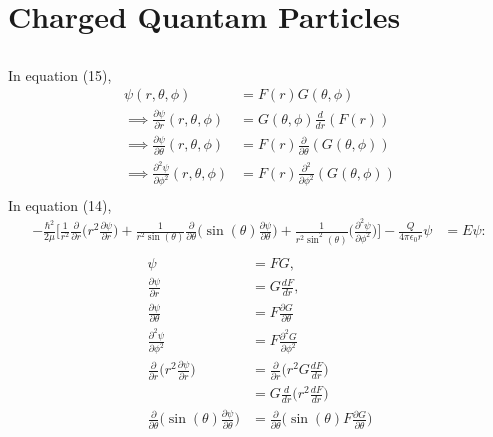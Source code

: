 \documentclass{article}
\begin{document}
\newpage
\section{Charged Quantam Particles}
\subsection{}%

\large{
In equation (15),\\
\begin{align*}
    \psi(r,\theta,\phi) &= F(r)G(\theta,\phi)\\
    \implies \frac{\partial \psi}{\partial r} (r,\theta,\phi) &= G(\theta, \phi)\frac{d}{dr}(F(r))\\
    \implies \frac{\partial \psi}{\partial \theta} (r,\theta,\phi) &= F(r)\frac{\partial}{\partial\theta}(G(\theta, \phi))\\
    \implies \frac{\partial^2 \psi}{\partial \phi^2} (r,\theta,\phi) &= F(r)\frac{\partial^2}{\partial\phi^2}(G(\theta, \phi))\\
\end{align*}
In equation (14),\\
\begin{align*}
    -\frac{\hbar^2}{2\mu}\Big[\frac{1}{r^2}\frac{\partial}{\partial r}\Big(r^2\frac{\partial \psi}{\partial r}\Big)+\frac{1}{r^2\sin(\theta)}\frac{\partial}{\partial \theta}\Big(\sin(\theta)\frac{\partial \psi}{\partial \theta}\Big)+\frac{1}{r^2\sin^2(\theta)}\Big(\frac{\partial^2\psi}{\partial \phi^2}\Big)\Big]-\frac{Q}{4\pi \epsilon_0r}\psi &= E\psi:\\
\end{align*}
\begin{align*}
    \psi &= FG,\\
    \frac{\partial \psi}{\partial r} &= G\frac{dF}{dr},\\
    \frac{\partial \psi}{\partial \theta} &= F\frac{\partial G}{\partial \theta}\\
    \frac{\partial^2 \psi}{\partial \phi^2} &= F\frac{\partial^2G}{\partial\phi^2}\\
    \frac{\partial}{\partial r}\Big(r^2\frac{\partial \psi}{\partial r}\Big) &= \frac{\partial}{\partial r}\Big(r^2G\frac{dF}{dr}\Big)\\
    &= G\frac{d}{dr}\Big(r^2\frac{dF}{dr}\Big)\\
    \frac{\partial}{\partial \theta}\Big(\sin(\theta)\frac{\partial \psi}{\partial \theta}\Big) &= \frac{\partial}{\partial \theta}\Big(\sin(\theta)F\frac{\partial G}{\partial \theta}\Big)\\

\end{align*}}
\end{document}
